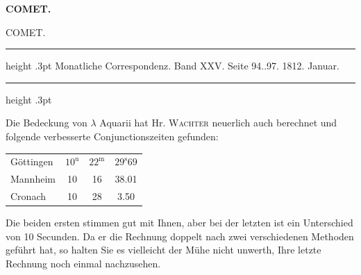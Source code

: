 \clearpage
\thispagestyle{empty}
\noindent{}%
\makebox[12mm][l]{}%
\parbox[t]{\dimexpr\linewidth-24mm\relax}{\centering\footnotesize\bfseries COMET.\par}%
\par\nobreak\medskip
\begin{center}\large COMET.\end{center}
\begin{center}\parbox{.84\linewidth}{\centering\small\frenchspacing
\hrule height .3pt\relax\vspace{2.5pt}
Monatliche Correspondenz. Band XXV. Seite 94..97. 1812. Januar.\par
\vspace{2.5pt}\hrule height .3pt\relax
}\end{center}

\par{}

\par\indent Die Bedeckung von $\lambda$ Aquarii hat Hr. \textsc{Wachter} neuerlich auch berechnet und folgende verbesserte Conjunctionszeiten gefunden:

\begin{center}
\fontsize{10}{12}\selectfont\setlength{\tabcolsep}{6pt}\renewcommand{\arraystretch}{1.15}\begin{tabular}{l|ccc}
Göttingen & $10^{\text{u}}$ & $22^{\text{m}}$ & $29^{\text{s}}69$ \\
Mannheim & 10 & 16 & 38.01 \\
Cronach & 10 & 28 & 3.50 \\
\end{tabular}
\end{center}

\noindent Die beiden ersten stimmen gut mit Ihnen, aber bei der letzten ist ein Unterschied von 10 Secunden. Da er die Rechnung doppelt nach zwei verschiedenen Methoden geführt hat, so halten Sie es vielleicht der Mühe nicht unwerth, Ihre letzte Rechnung noch einmal nachzusehen.
